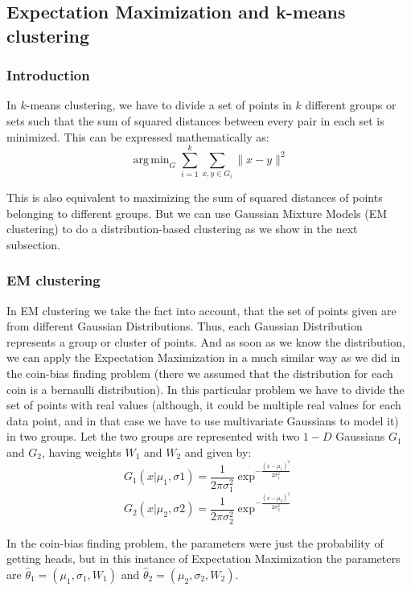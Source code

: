 \documentclass[journal, compsoc]{IEEEtran}
\DeclareMathOperator*{\argmin}{arg\,min}
\begin{document}
\subsection{Expectation Maximization and k-means clustering}
\subsubsection{Introduction}
In $k$-means clustering, we have to divide a set of points in $k$ different groups or sets such that the sum of
squared distances between every pair in each set is minimized. This can be expressed mathematically as:
\[
    \argmin_G \sum_{i = 1}^{k}\sum_{x,y\in G_{i}} \|x - y\|^{2}
\]

This is also equivalent to maximizing the sum of squared distances of points belonging to different groups. But we can use Gaussian Mixture Models (EM clustering) to
do a distribution-based clustering as we show in the next subsection.

\subsubsection{EM clustering}
In EM clustering we take the fact into account, that the set of points given are from different Gaussian Distributions.
Thus, each Gaussian Distribution represents a group or cluster of points\cite{aibook}. And as soon as we know the distribution, we can
apply the Expectation Maximization in a much similar way as we did in the coin-bias finding problem (there we assumed that the
distribution for each coin is a bernaulli distribution). In this particular problem we have to divide the set of points with
real values (although, it could be multiple real values for each data point, and in that case we have to use multivariate
Gaussians to model it) in two groups. Let the two groups are represented with two $1-D$ Gaussians $G_{1}$ and $G_{2}$, having
weights $W_1$ and $W_2$ and given by:
\[
    G_{1}(x | \mu_{1}, \sigma{1}) = \frac{1}{2\pi\sigma_{1}^{2}}\exp^{-\frac{(x - \mu_{1})^{2}}{2\sigma_{1}^{2}}}
\]
\[
    G_{2}(x | \mu_{2}, \sigma{2}) = \frac{1}{2\pi\sigma_{2}^{2}}\exp^{-\frac{(x - \mu_{2})^{2}}{2\sigma_{2}^{2}}}
\]

In the coin-bias finding problem, the parameters were just the probability of getting heads, but in this
instance of Expectation Maximization the parameters are ${\hat{\theta}_{1} = (\mu_{1}, \sigma_{1}, W_1)}$ and
$\hat{\theta}_{2} = (\mu_{2}, \sigma_{2}, W_2)$.\\
\end{document}
